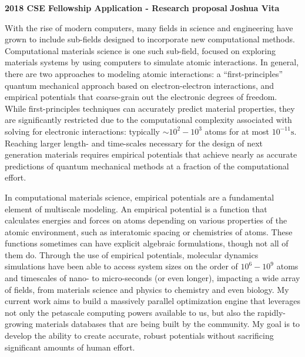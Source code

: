 \documentclass[11pt]{article}
\begin{document}
\begin{center}
    \textbf{2018 CSE Fellowship Application - Research proposal}
\hfill
\textbf{Joshua Vita}
\end{center}
\noindent\hrulefill

\bigskip

With the rise of modern computers, many fields in science and engineering have grown to include sub-fields designed to incorporate new computational methods. Computational materials science is one such sub-field, focused on exploring materials systems by using computers to simulate atomic interactions. In general, there are two approaches to modeling atomic interactions: a ``first-principles'' quantum mechanical approach based on electron-electron interactions, and empirical potentials that coarse-grain out the electronic degrees of freedom. While first-principles techniques can accurately predict material properties, they are significantly restricted due to the computational complexity associated with solving for electronic interactions: typically $\sim10^2-10^3$ atoms for at most $10^{-11}\text{s}$. Reaching larger length- and time-scales necessary for the design of next generation materials requires empirical potentials that achieve nearly as accurate predictions of quantum mechanical methods at a fraction of the computational effort.


In computational materials science, empirical potentials are a fundamental element of multiscale modeling. An empirical potential is a function that calculates energies and forces on atoms depending on various properties of the atomic environment, such as interatomic spacing or chemistries of atoms. These functions sometimes can have explicit algebraic formulations, though not all of them do. Through the use of empirical potentials, molecular dynamics simulations have been able to access system sizes on the order of $10^6-10^9$ atoms and timescales of nano- to micro-seconds (or even longer), impacting a wide array of fields, from materials science and physics to chemistry and even biology. My current work aims to build a massively parallel optimization engine that leverages not only the petascale computing powers available to us, but also the rapidly-growing materials databases that are being built by the community. My goal is to develop the ability to create accurate, robust potentials without sacrificing significant amounts of human effort.
\end{document}
